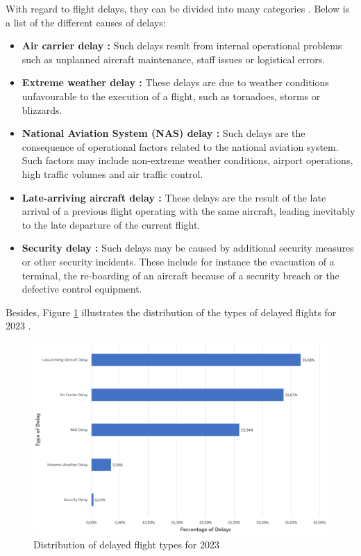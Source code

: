 \documentclass[12pt,oneside]{book} %
\begin{document}
\noindent With regard to flight delays, they can be divided into many categories \citep{BTS_flight_delays,BTS_flight_delays1}. Below is a list of the different causes of delays: 
\begin{itemize}
    \item \textbf{Air carrier delay \citep{BTS_flight_delays,BTS_flight_delays1}:} Such delays result from internal operational problems such as unplanned aircraft maintenance, staff issues or logistical errors. 
    \item \textbf{Extreme weather delay \citep{BTS_flight_delays,BTS_flight_delays1}:} These delays are due to weather conditions unfavourable to the execution of a flight, such as tornadoes, storms or blizzards.
    \item \textbf{National Aviation System (NAS) delay \citep{BTS_flight_delays,BTS_flight_delays1}:} Such delays are the consequence of operational factors related to the national aviation system. Such factors may include non-extreme weather conditions, airport operations, high traffic volumes and air traffic control.
    \item \textbf{Late-arriving aircraft delay \citep{BTS_flight_delays,BTS_flight_delays1}:} These delays are the result of the late arrival of a previous flight operating with the same aircraft, leading inevitably to the late departure of the current flight.
    \item \textbf{Security delay \citep{BTS_flight_delays,BTS_flight_delays1}:} Such delays may be caused by additional security measures or other security incidents. These include for instance the evacuation of a terminal, the re-boarding of an aircraft because of a security breach or the defective control equipment. 
\end{itemize}

\noindent Besides, Figure \ref{fig:flights_delays} illustrates the distribution of the types of delayed flights for 2023 \cite{BTS_flight_delays_statistics}.

\begin{figure}[H]
    \centering
    \includegraphics[width=0.89\linewidth]{Image/flight_delays_type.png}
    \caption{Distribution of delayed flight types for 2023 \cite{BTS_flight_delays_statistics}}
    \label{fig:flights_delays}
\end{figure}
\end{document}
